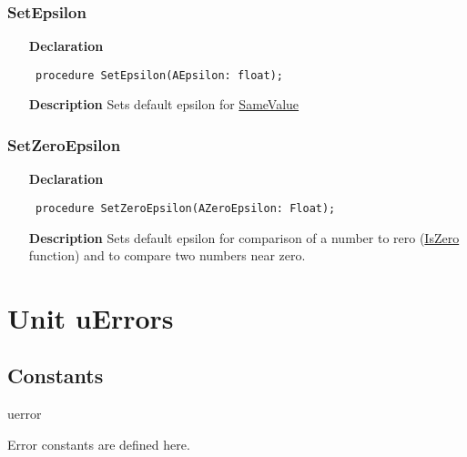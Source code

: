 \documentclass[12pt,a4paper,oneside]{report}
\newcommand{\lmath}[1]{   %
	\marginpar{\vspace{#1} 
		\begin{flushright}
			LMath
	\end{flushright} }
}
\newcommand{\declarationitem}[1]{\textbf{#1}}
\newcommand{\descriptiontitle}[1]{\textbf{#1}}
\newcommand{\code}[1]{\texttt{#1}}
\begin{document}
\subsubsection{SetEpsilon}\label{utypes-setepsilon}
\lmath{-24pt}
\begin{itemize}\item[\declarationitem{Declaration}\hfill]
	\begin{flushleft}
		\code{
			procedure SetEpsilon(AEpsilon: float);}
		
	\end{flushleft}
	\par
	\item[\descriptiontitle{Description}]
	Sets default epsilon for \hyperref[utypes-SameValue]{SameValue}
\end{itemize}
\subsubsection{SetZeroEpsilon}
\lmath{-24pt}
\label{utypes-SetZeroEpsilon}
\begin{itemize}\item[\declarationitem{Declaration}\hfill]
	\begin{flushleft}
		\code{
			procedure SetZeroEpsilon(AZeroEpsilon: Float);}
	\end{flushleft}
	\par
	\item[\descriptiontitle{Description}]
	Sets default epsilon for comparison of a number to rero (\hyperref[utypes-IsZero]{IsZero} function) and to compare two numbers near zero.
\end{itemize}

\section{Unit uErrors}
\subsection{Constants}
\label{uErrors}\hypertarget{genmath}{uerror}Error constants are defined here.
\end{document}

